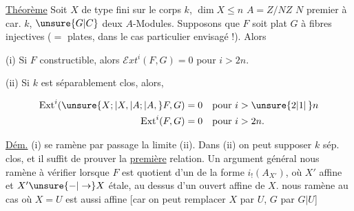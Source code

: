\uline{Théorème}  Soit $X$  de type fini sur le corps $k$, $\dim X\leq n$ $A=Z/NZ$ $N$ premier à car. $k$,   $\unsure{G|C}$ deux $A$-Modules. Supposons que $F$ soit plat  $G$ à fibres injectives ($=$ plates, dans le cas particulier envisagé !). Alors

(i) Si $F$ constructible, alors $\mathscr{E}xt^i(F,G)=0$ pour $i>2n$.

(ii) Si $k$ est séparablement clos, alors, 

\[
\begin{aligned}
\mathrm{Ext}^i(\unsure{X;|X,|A;|A,}F,G)&=0 &&\text{pour } i>\unsure{2|1|\,}n\\
\mathrm{Ext}^i(F,G)&=0 &&\text{pour } i>2n.
\end{aligned}
\]

\uline{Dém.} (i) se ramène par passage  la limite  (ii). Dans (ii) on peut supposer $k$ sép. clos, et  il suffit de prouver la \uline{première} relation.  Un argument général nous ramène à  vérifier  lorsque $F$ est quotient d'un  de la forme $i_!(A_{X'})$, où $X'$ affine et $X'\unsure{-|\to}X$ étale, au dessus d'un ouvert affine  de $X$.  nous ramène au cas où $X=U$ est aussi affine [car on peut remplacer $X$ par $U$, $G$ par $G|U$]
